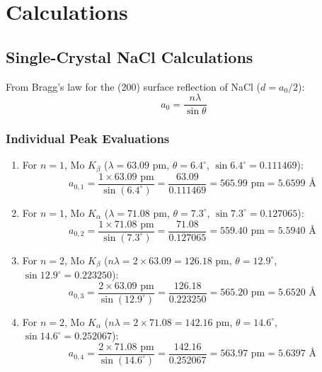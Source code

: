 \documentclass[12pt,a4paper]{article}
\begin{document}
\newpage

\section{Calculations}

\subsection{Single-Crystal NaCl Calculations}
From Bragg's law for the (200) surface reflection of NaCl ($d = a_0/2$):
\begin{equation}
    a_0 = \frac{n\lambda}{\sin\theta}
\end{equation}

\subsubsection{Individual Peak Evaluations}
\begin{enumerate}
    \item For $n=1$, $\text{Mo } K_\beta$ ($\lambda = 63.09\text{ pm}$, $\theta = 6.4^\circ$, $\sin 6.4^\circ = 0.111469$):
    \begin{equation}
        a_{0,1} = \frac{1 \times 63.09\text{ pm}}{\sin(6.4^\circ)} = \frac{63.09}{0.111469} = 565.99\text{ pm} = 5.6599\text{ \AA}
    \end{equation}

    \item For $n=1$, $\text{Mo } K_\alpha$ ($\lambda = 71.08\text{ pm}$, $\theta = 7.3^\circ$, $\sin 7.3^\circ = 0.127065$):
    \begin{equation}
        a_{0,2} = \frac{1 \times 71.08\text{ pm}}{\sin(7.3^\circ)} = \frac{71.08}{0.127065} = 559.40\text{ pm} = 5.5940\text{ \AA}
    \end{equation}

    \item For $n=2$, $\text{Mo } K_\beta$ ($n\lambda = 2 \times 63.09 = 126.18\text{ pm}$, $\theta = 12.9^\circ$, $\sin 12.9^\circ = 0.223250$):
    \begin{equation}
        a_{0,3} = \frac{2 \times 63.09\text{ pm}}{\sin(12.9^\circ)} = \frac{126.18}{0.223250} = 565.20\text{ pm} = 5.6520\text{ \AA}
    \end{equation}

    \item For $n=2$, $\text{Mo } K_\alpha$ ($n\lambda = 2 \times 71.08 = 142.16\text{ pm}$, $\theta = 14.6^\circ$, $\sin 14.6^\circ = 0.252067$):
    \begin{equation}
        a_{0,4} = \frac{2 \times 71.08\text{ pm}}{\sin(14.6^\circ)} = \frac{142.16}{0.252067} = 563.97\text{ pm} = 5.6397\text{ \AA}
    \end{equation}
\end{enumerate}
\end{document}
